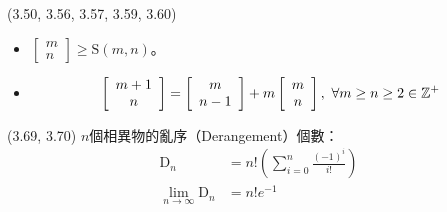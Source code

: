 \begin{theorem}{(3.50, 3.56, 3.57, 3.59, 3.60)}
\begin{itemize}
\begin{itemize}
            \item $\left[\begin{array}{c}m\\n\end{array}\right] \ge \text{S}(m, n)$。
            \item \begin{equation}
                \left[\begin{array}{c}m + 1\\n\end{array}\right] = \left[\begin{array}{c}m\\n - 1\end{array}\right] + m\left[\begin{array}{c}m\\n\end{array}\right], \ \forall m \ge n \ge 2 \in \N
            \end{equation}
        \end{itemize}
    \end{itemize}
\end{theorem}

\item \begin{theorem}{(3.69, 3.70)} $n$個相異物的亂序（Derangement）個數：
    \begin{equation}
        \begin{aligned}
            \text{D}_n & = n!(\sum_{i = 0}^{n}\frac{(-1)^i}{i!}) \\
            \lim_{n \to \infty} \text{D}_n & = n!e^{-1}
        \end{aligned}
    \end{equation}
\end{theorem}
